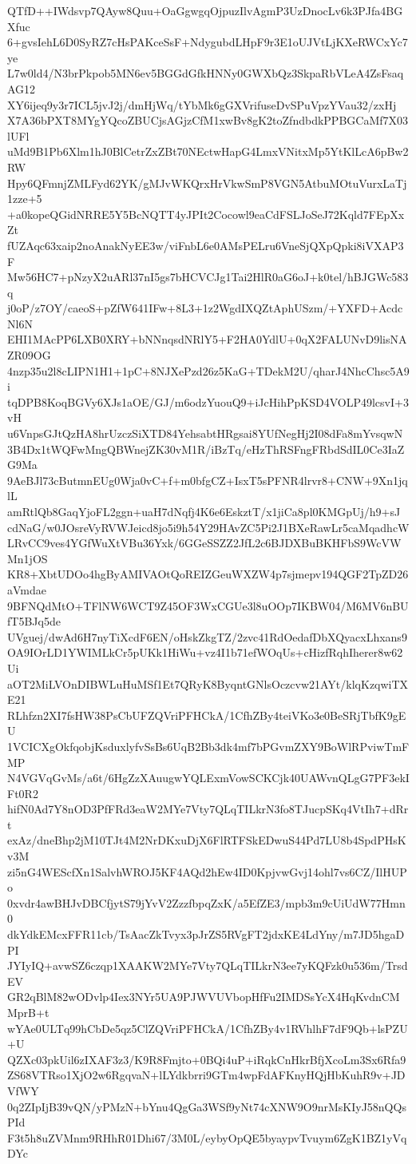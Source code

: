 QTfD++IWdsvp7QAyw8Quu+OaGgwgqOjpuzIlvAgmP3UzDnocLv6k3PJfa4BGXfuc
6+gvsIehL6D0SyRZ7cHsPAKceSsF+NdygubdLHpF9r3E1oUJVtLjKXeRWCxYc7ye
L7w0ld4/N3brPkpob5MN6ev5BGGdGfkHNNy0GWXbQz3SkpaRbVLeA4ZsFsaqAG12
XY6ijeq9y3r7ICL5jvJ2j/dmHjWq/tYbMk6gGXVrifuseDvSPuVpzYVau32/zxHj
X7A36bPXT8MYgYQcoZBUCjsAGjzCfM1xwBv8gK2toZfndbdkPPBGCaMf7X03lUFl
uMd9B1Pb6Xlm1hJ0BlCetrZxZBt70NEctwHapG4LmxVNitxMp5YtKlLcA6pBw2RW
Hpy6QFmnjZMLFyd62YK/gMJvWKQrxHrVkwSmP8VGN5AtbuMOtuVurxLaTj1zze+5
+a0kopeQGidNRRE5Y5BcNQTT4yJPIt2Cocowl9eaCdFSLJoSeJ72Kqld7FEpXxZt
fUZAqc63xaip2noAnakNyEE3w/viFnbL6e0AMsPELru6VneSjQXpQpki8iVXAP3F
Mw56HC7+pNzyX2uARl37nI5gs7bHCVCJg1Tai2HlR0aG6oJ+k0tel/hBJGWc583q
j0oP/z7OY/caeoS+pZfW641IFw+8L3+1z2WgdIXQZtAphUSzm/+YXFD+AcdcNl6N
EHI1MAcPP6LXB0XRY+bNNnqsdNRlY5+F2HA0YdlU+0qX2FALUNvD9lisNAZR09OG
4nzp35u2l8cLIPN1H1+1pC+8NJXePzd26z5KaG+TDekM2U/qharJ4NhcChsc5A9i
tqDPB8KoqBGVy6XJs1aOE/GJ/m6odzYuouQ9+iJcHihPpKSD4VOLP49lcsvI+3vH
u6VnpsGJtQzHA8hrUzczSiXTD84YehsabtHRgsai8YUfNegHj2I08dFa8mYvsqwN
3B4Dx1tWQFwMngQBWnejZK30vM1R/iBzTq/eHzThRSFngFRbdSdIL0Ce3IaZG9Ma
9AeBJl73cButmnEUg0Wja0vC+f+m0bfgCZ+IsxT5sPFNR4lrvr8+CNW+9Xn1jqlL
amRtlQb8GaqYjoFL2ggn+uaH7dNqfj4K6e6EskztT/x1jiCa8pl0KMGpUj/h9+sJ
cdNaG/w0JOsreVyRVWJeicd8jo5i9h54Y29HAvZC5Pi2J1BXeRawLr5caMqadhcW
LRvCC9ves4YGfWuXtVBu36Yxk/6GGeSSZZ2JfL2c6BJDXBuBKHFbS9WcVWMn1jOS
KR8+XbtUDOo4hgByAMIVAOtQoREIZGeuWXZW4p7sjmepv194QGF2TpZD26aVmdae
9BFNQdMtO+TFlNW6WCT9Z45OF3WxCGUe3l8uOOp7IKBW04/M6MV6nBUfT5BJq5de
UVguej/dwAd6H7nyTiXcdF6EN/oHskZkgTZ/2zvc41RdOedafDbXQyacxLhxans9
OA9IOrLD1YWIMLkCr5pUKk1HiWu+vz4I1b71efWOqUs+cHizfRqhIherer8w62Ui
aOT2MiLVOnDIBWLuHuMSf1Et7QRyK8ByqntGNlsOczcvw21AYt/klqKzqwiTXE21
RLhfzn2XI7fsHW38PsCbUFZQVriPFHCkA/1CfhZBy4teiVKo3e0BeSRjTbfK9gEU
1VCICXgOkfqobjKsduxlyfvSsBs6UqB2Bb3dk4mf7bPGvmZXY9BoWlRPviwTmFMP
N4VGVqGvMs/a6t/6HgZzXAuugwYQLExmVowSCKCjk40UAWvnQLgG7PF3ekIFt0R2
hifN0Ad7Y8nOD3PfFRd3eaW2MYe7Vty7QLqTILkrN3fo8TJucpSKq4VtIh7+dRrt
exAz/dneBhp2jM10TJt4M2NrDKxuDjX6FlRTFSkEDwuS44Pd7LU8b4SpdPHsKv3M
zi5nG4WEScfXn1SalvhWROJ5KF4AQd2hEw4ID0KpjvwGvj14ohl7vs6CZ/IlHUPo
0xvdr4awBHJvDBCfjytS79jYvV2ZzzfbpqZxK/a5EfZE3/mpb3m9cUiUdW77Hmn0
dkYdkEMcxFFR11cb/TsAacZkTvyx3pJrZS5RVgFT2jdxKE4LdYny/m7JD5hgaDPI
JYIyIQ+avwSZ6czqp1XAAKW2MYe7Vty7QLqTILkrN3ee7yKQFzk0u536m/TrsdEV
GR2qBlM82wODvlp4Iex3NYr5UA9PJWVUVbopHfFu2IMDSsYcX4HqKvdnCMMprB+t
wYAe0ULTq99hCbDe5qz5ClZQVriPFHCkA/1CfhZBy4v1RVhlhF7dF9Qb+lsPZU+U
QZXc03pkUil6zIXAF3z3/K9R8Fmjto+0BQi4uP+iRqkCnHkrBfjXcoLm3Sx6Rfa9
ZS68VTRso1XjO2w6RgqvaN+lLYdkbrri9GTm4wpFdAFKnyHQjHbKuhR9v+JDVfWY
0q2ZIpIjB39vQN/yPMzN+bYnu4QgGa3WSf9yNt74cXNW9O9nrMsKIyJ58nQQsPId
F3t5h8uZVMnm9RHhR01Dhi67/3M0L/eybyOpQE5byaypvTvuym6ZgK1BZ1yVqDYc
